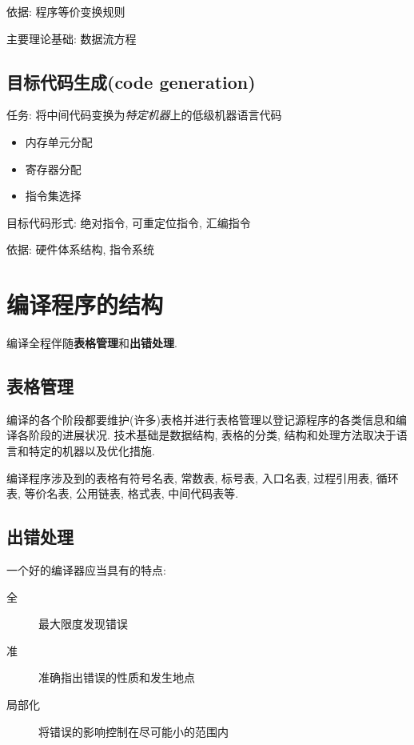         依据: 程序等价变换规则

        主要理论基础: 数据流方程

    \subsection{目标代码生成(code generation)}

        任务: 将中间代码变换为\textsl{特定机器}上的低级机器语言代码

        \begin{itemize}
            \item 内存单元分配
            \item 寄存器分配
            \item 指令集选择
        \end{itemize}

        目标代码形式: 绝对指令, 可重定位指令, 汇编指令

        依据: 硬件体系结构, 指令系统

\section{编译程序的结构}

    编译全程伴随\textbf{表格管理}和\textbf{出错处理}.

    \subsection{表格管理}

        编译的各个阶段都要维护(许多)表格并进行表格管理以登记源程序的各类信息和编译各阶段的进展状况. 技术基础是数据结构, 表格的分类, 结构和处理方法取决于语言和特定的机器以及优化措施.

        编译程序涉及到的表格有符号名表, 常数表, 标号表, 入口名表, 过程引用表, 循环表, 等价名表, 公用链表, 格式表, 中间代码表等.

    \subsection{出错处理}
        
        一个好的编译器应当具有的特点:
        \begin{description}
            \item[全] 最大限度发现错误
            \item[准] 准确指出错误的性质和发生地点
            \item[局部化] 将错误的影响控制在尽可能小的范围内
        \end{description}

